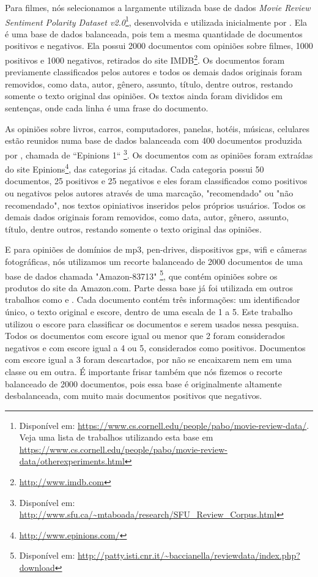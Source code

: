 Para filmes, nós selecionamos a largamente utilizada base de dados \textit{Movie Review Sentiment Polarity Dataset v2.0}\footnote{Disponível em: \url{https://www.cs.cornell.edu/people/pabo/movie-review-data/}. Veja uma lista de trabalhos utilizando esta base em \url{https://www.cs.cornell.edu/people/pabo/movie-review-data/otherexperiments.html}}, desenvolvida e utilizada inicialmente por \cite{pang2004sentimental}. Ela é uma base de dados balanceada, pois tem a mesma quantidade de documentos positivos e negativos. Ela possui 2000 documentos com opiniões sobre filmes, 1000 positivos e 1000 negativos, retirados do site IMDB\footnote{\url{http://www.imdb.com}}. Os documentos foram previamente classificados pelos autores e todos os demais dados originais foram removidos, como data, autor, gênero, assunto, título, dentre outros, restando somente o texto original das opiniões. Os textos ainda foram divididos em sentenças, onde cada linha é uma frase do documento.

As opiniões sobre livros, carros, computadores, panelas, hotéis, músicas, celulares estão reunidos numa base de dados balanceada com 400 documentos  produzida por \cite{taboada2011lexicon}, chamada de ``Epinions 1`` \footnote{Disponível em: \url{http://www.sfu.ca/~mtaboada/research/SFU_Review_Corpus.html}}. Os documentos com as opiniões foram extraídas do site Epinions\footnote{\url{http://www.epinions.com/}}, das categorias já citadas. Cada categoria possui 50 documentos, 25 positivos e 25 negativos e eles foram classificados como positivos ou negativos pelos autores através de uma marcação, "recomendado" ou "não recomendado", nos textos opiniativos inseridos pelos próprios usuários. Todos os demais dados originais foram removidos, como data, autor, gênero, assunto, título, dentre outros, restando somente o texto original das opiniões.

E para opiniões de domínios de mp3, pen-drives, dispositivos gps, wifi e câmeras fotográficas, nós utilizamos um recorte balanceado de 2000 documentos de uma base de dados chamada  "Amazon-83713" \footnote{Disponível em: \url{http://patty.isti.cnr.it/~baccianella/reviewdata/index.php?download}}, que contém opiniões sobre os produtos do site da Amazon.com. Parte dessa base já foi utilizada em outros trabalhos como \cite{baccianella2010selecting} e \cite{baccianella2014feature}. Cada documento contém três informações: um identificador único, o texto original e escore, dentro de uma escala de 1 a 5. Este trabalho utilizou o escore para classificar os documentos e serem usados nessa pesquisa. Todos os documentos com escore igual ou menor que 2 foram considerados negativos e com escore igual a 4 ou 5, considerados como positivos. Documentos com escore igual a 3 foram descartados, por não se encaixarem nem em uma classe ou em outra. É importante frisar também que nós fizemos o recorte balanceado de 2000 documentos, pois essa base é originalmente altamente desbalanceada, com muito mais documentos positivos que negativos.  



